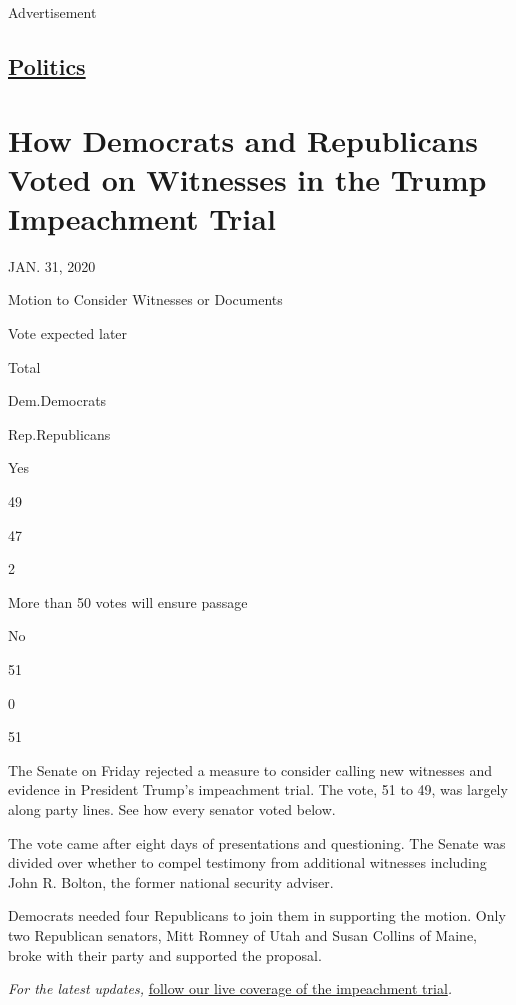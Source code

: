 Advertisement

\hypertarget{-politics-}{%
\subsection{\texorpdfstring{ \href{/section/politics}{Politics}
}{ Politics }}\label{-politics-}}

\hypertarget{how-democrats-and-republicans-voted-on-witnesses-in-the-trump-impeachment-trial}{%
\section{How Democrats and Republicans Voted on Witnesses in the Trump
Impeachment
Trial}\label{how-democrats-and-republicans-voted-on-witnesses-in-the-trump-impeachment-trial}}

JAN. 31, 2020

Motion to Consider Witnesses or Documents

Vote expected later

Total

Dem.Democrats

Rep.Republicans

Yes

49

47

2

More than 50 votes will ensure passage

No

51

0

51

The Senate on Friday rejected a measure to consider calling new
witnesses and evidence in President Trump's impeachment trial. The vote,
51 to 49, was largely along party lines. See how every senator voted
below.

The vote came after eight days of presentations and questioning. The
Senate was divided over whether to compel testimony from additional
witnesses including John R. Bolton, the former national security
adviser.

Democrats needed four Republicans to join them in supporting the motion.
Only two Republican senators, Mitt Romney of Utah and Susan Collins of
Maine, broke with their party and supported the proposal.

\emph{For the latest updates,}
\href{https://www.nytimes3xbfgragh.onion/live/2020/trump-impeachment-trial-01-31}{follow
our live coverage of the impeachment trial}\emph{.}

